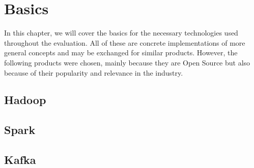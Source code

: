 
\section{Basics}

In this chapter, we will cover the basics for the necessary technologies used throughout the evaluation. All of these are concrete implementations of more general concepts and may be exchanged for similar products. However, the following products were chosen, mainly because they are Open Source
but also because of their popularity and relevance in the industry.



\subsection{Hadoop}
\subsection{Spark}
\subsection{Kafka}
